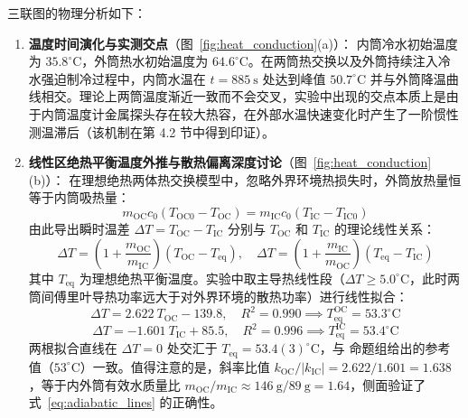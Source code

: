 \documentclass[10pt, a4paper]{ctexart}
\begin{document}
三联图的物理分析如下：
\begin{enumerate}
\item \textbf{温度时间演化与实测交点}（图~\ref{fig:heat_conduction}(a)）：
内筒冷水初始温度为 $35.8^\circ\mathrm{C}$，外筒热水初始温度为 $64.6^\circ\mathrm{C}$。在两筒热交换以及外筒持续注入冷水强迫制冷过程中，内筒水温在 $t = 885\ \mathrm{s}$ 处达到峰值 $50.7^\circ\mathrm{C}$ 并与外筒降温曲线相交。理论上两筒温度渐近一致而不会交叉，实验中出现的交点本质上是由于内筒温度计金属探头存在较大热容，在外部水温快速变化时产生了一阶惯性测温滞后（该机制在第 4.2 节中得到印证）。

\item \textbf{线性区绝热平衡温度外推与散热偏离深度讨论}（图~\ref{fig:heat_conduction}(b)）：
在理想绝热两体热交换模型中，忽略外界环境热损失时，外筒放热量恒等于内筒吸热量：
\begin{equation}
m_{\mathrm{OC}} c_0 (T_{\mathrm{OC0}} - T_{\mathrm{OC}}) = m_{\mathrm{IC}} c_0 (T_{\mathrm{IC}} - T_{\mathrm{IC0}})
\end{equation}
由此导出瞬时温差 $\Delta T = T_{\mathrm{OC}} - T_{\mathrm{IC}}$ 分别与 $T_{\mathrm{OC}}$ 和 $T_{\mathrm{IC}}$ 的理论线性关系：
\begin{equation}
\Delta T = \left(1 + \frac{m_{\mathrm{OC}}}{m_{\mathrm{IC}}}\right)(T_{\mathrm{OC}} - T_{\mathrm{eq}}), \quad \Delta T = \left(1 + \frac{m_{\mathrm{IC}}}{m_{\mathrm{OC}}}\right)(T_{\mathrm{eq}} - T_{\mathrm{IC}})
\label{eq:adiabatic_lines}
\end{equation}
其中 $T_{\mathrm{eq}}$ 为理想绝热平衡温度。实验中取主导热线性段（$\Delta T \ge 5.0^\circ\mathrm{C}$，此时两筒间傅里叶导热功率远大于对外界环境的散热功率）进行线性拟合：
\begin{equation}
\Delta T = 2.622\ T_{\mathrm{OC}} - 139.8, \quad R^2 = 0.990 \implies T_{\mathrm{eq}}^{\mathrm{OC}} = 53.3^\circ\mathrm{C}
\end{equation}
\begin{equation}
\Delta T = -1.601\ T_{\mathrm{IC}} + 85.5, \quad R^2 = 0.996 \implies T_{\mathrm{eq}}^{\mathrm{IC}} = 53.4^\circ\mathrm{C}
\end{equation}
两根拟合直线在 $\Delta T = 0$ 处交汇于 $T_{\mathrm{eq}} = 53.4(3)^\circ\mathrm{C}$，与 命题组给出的参考值（$53^\circ\mathrm{C}$）一致。值得注意的是，斜率比值 $k_{\mathrm{OC}}/|k_{\mathrm{IC}}| = 2.622/1.601 = 1.638$，等于内外筒有效水质量比 $m_{\mathrm{OC}}/m_{\mathrm{IC}} \approx 146\ \mathrm{g} / 89\ \mathrm{g} = 1.64$，侧面验证了式~\eqref{eq:adiabatic_lines} 的正确性。


\end{enumerate}
\end{document}
